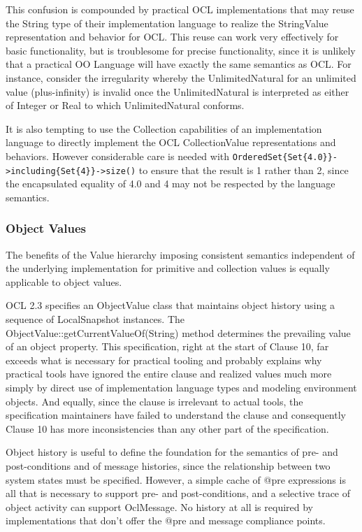 \documentclass{eceasst}
\begin{document}
This confusion is compounded by practical OCL implementations that may reuse the String type of their implementation language to realize the StringValue representation and behavior for OCL. This reuse can work very effectively for basic functionality, but is troublesome for precise functionality, since it is unlikely that a practical OO Language will have exactly the same semantics as OCL. For instance, consider the irregularity whereby the UnlimitedNatural for an unlimited value (plus-infinity)  is invalid once the UnlimitedNatural is interpreted as either of Integer or Real to which UnlimitedNatural conforms.

It is also tempting to use the Collection capabilities of an implementation language to directly implement the OCL CollectionValue representations and behaviors. However considerable care is needed with \verb|OrderedSet{Set{4.0}}->including{Set{4}}->size()| to ensure that the result is 1 rather than 2, since the encapsulated equality of 4.0 and 4 may not be respected by the language semantics.

\subsubsection{Object Values}

The benefits of the Value hierarchy imposing consistent semantics independent of the underlying implementation for primitive and collection values is equally applicable to object values.

OCL 2.3 specifies an ObjectValue class that maintains object history using a sequence of LocalSnapshot instances. The  ObjectValue::getCurrentValueOf(String) method determines the prevailing value of an object property. This specification, right at the start of Clause 10, far exceeds what is necessary for practical tooling and probably explains why practical tools have ignored the entire clause and realized values  much more simply by direct use of implementation language types and modeling environment objects. And equally, since the clause is irrelevant to actual tools, the specification maintainers have failed to understand the clause and consequently Clause 10 has more inconsistencies than any other part of the specification.

Object history is useful to define the foundation for the semantics of pre- and post-conditions and of message histories, since the relationship between two system states must be specified. However, a simple cache of @pre expressions is all that is necessary to support pre- and post-conditions, and a selective trace of object activity can support OclMessage. No history at all is required by implementations that don't offer the @pre and message compliance points.
\end{document}
